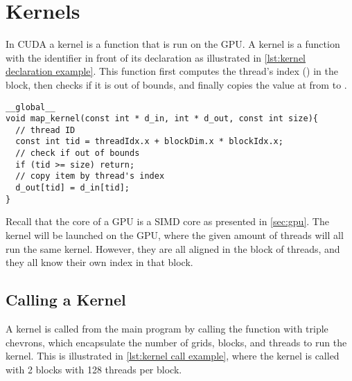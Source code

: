 \section{Kernels}
\label{sec:kernels}

In CUDA a kernel is a function that is run on the GPU.
A kernel is a function with the  identifier in front of its declaration as illustrated in \cref{lst:kernel declaration example}.
This function first computes the thread's index () in the block, then checks if it is out of bounds, and finally copies the value at  from  to .

\begin{lstlisting}[caption={Kernel declaration example}, label={lst:kernel declaration example}]
__global__
void map_kernel(const int * d_in, int * d_out, const int size){
  // thread ID
  const int tid = threadIdx.x + blockDim.x * blockIdx.x;
  // check if out of bounds
  if (tid >= size) return;
  // copy item by thread's index
  d_out[tid] = d_in[tid];
}
\end{lstlisting}

Recall that the core of a GPU is a SIMD core as presented in \cref{sec:gpu}.
The kernel will be launched on the GPU, where the given amount of threads will all run the same kernel.
However, they are all aligned in the block of threads, and they all know their own index in that block.

\subsection{Calling a Kernel}
\label{sec:calling a kernel}

A kernel is called from the main program by calling the function with triple chevrons, which encapsulate the number of grids, blocks, and threads to run the kernel.
This is illustrated in \cref{lst:kernel call example}, where the kernel is called with 2 blocks with 128 threads per block.


